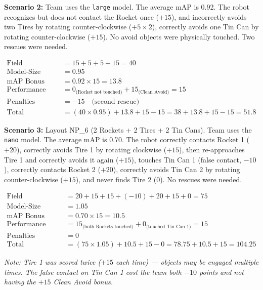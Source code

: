 \documentclass[a4]{article}
\begin{document}
\textbf{Scenario 2:} Team uses the \texttt{large} model. The average mAP is 0.92. The robot recognizes but does not contact the Rocket once ($+15$), and incorrectly avoids two Tires by rotating counter-clockwise ($+5 \times 2$), correctly avoids one Tin Can by rotating counter-clockwise ($+15$). No avoid objects were physically touched. Two rescues were needed.

\begin{align*}
\text{Field Performance} &= 15 + 5 + 5 + 15 = 40 \\
\text{Model-Size Multiplier} &= 0.95 \\
\text{mAP Bonus} &= 0.92 \times 15 = 13.8 \\
\text{Performance Bonus} &= 0_{\text{(Rocket not touched)}} + 15_{\text{(Clean Avoid)}} = 15 \\
\text{Penalties} &= -15 \quad \text{(second rescue)} \\
\text{Total} &= (40 \times 0.95) + 13.8 + 15 - 15 = 38 + 13.8 + 15 - 15 = \mathbf{51.8}
\end{align*}

\textbf{Scenario 3:} Layout NP\_6 (2 Rockets + 2 Tires + 2 Tin Cans). Team uses the \texttt{nano} model. The average mAP is 0.70. The robot correctly contacts Rocket 1 ($+20$), correctly avoids Tire 1 by rotating clockwise ($+15$), then re-approaches Tire 1 and correctly avoids it again ($+15$), touches Tin Can 1 (false contact, $-10$), correctly contacts Rocket 2 ($+20$), correctly avoids Tin Can 2 by rotating counter-clockwise ($+15$), and never finds Tire 2 ($0$). No rescues were needed.

\begin{align*}
\text{Field Performance} &= 20 + 15 + 15 + (-10) + 20 + 15 + 0 = 75 \\
\text{Model-Size Multiplier} &= 1.05 \\
\text{mAP Bonus} &= 0.70 \times 15 = 10.5 \\
\text{Performance Bonus} &= 15_{\text{(both Rockets touched)}} + 0_{\text{(touched Tin Can 1)}} = 15 \\
\text{Penalties} &= 0 \\
\text{Total} &= (75 \times 1.05) + 10.5 + 15 - 0 = 78.75 + 10.5 + 15 = \mathbf{104.25}
\end{align*}

\textit{Note: Tire 1 was scored twice ($+15$ each time) --- objects may be engaged multiple times. The false contact on Tin Can 1 cost the team both $-10$ points and not having the $+15$ Clean Avoid bonus.}
\end{document}
